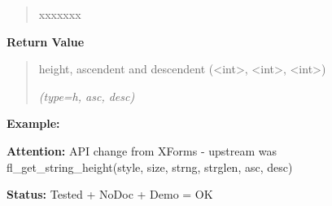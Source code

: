 \begin{boxedminipage}{\funcwidth}
\begin{quote}
\begin{Ventry}{xxxxxxx}
        \end{Ventry}

      \end{quote}

      \textbf{Return Value}
    \vspace{-1ex}

      \begin{quote}
      height, ascendent and descendent ({\textless}int{\textgreater}, 
      {\textless}int{\textgreater}, {\textless}int{\textgreater})

      {\it (type=h, asc, desc)}

      \end{quote}

\textbf{Example:} 

\textbf{Attention:} API change from XForms - upstream was fl\_get\_string\_height(style, size, 
strng, strglen, asc, desc)



\textbf{Status:} Tested + NoDoc + Demo = OK



    \end{boxedminipage}

    \label{xformslib:library:fl_get_string_width}

    \vspace{0.5ex}


